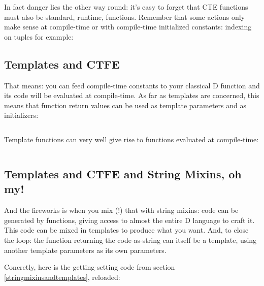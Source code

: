 In fact danger lies the other way round: it's easy to forget that CTE functions must also be standard, runtime, functions. Remember that some actions only make sense at compile-time or with compile-time initialized constants: indexing on tuples for example:

\subsection{}



\subsection{Templates and CTFE} \label{templatesandctfe}

That means: you can feed compile-time constants to your classical D function and its code will be evaluated at compile-time. As far as templates are concerned, this means that function return values can be used as template parameters and as  initializers:

\begin{verbatim}

\end{verbatim}

Template functions can very well give rise to functions evaluated at compile-time:

\begin{verbatim}
\end{verbatim}

\subsection{Templates and CTFE and String Mixins, oh my!}
\label{templatesandctfeandstringmixins}

And the fireworks is when you mix (!) that with string mixins: code can be generated by functions, giving access to almost the entire D language to craft it. This code can be mixed in templates to produce what you want. And, to close the loop: the function returning the code-as-string can itself be a template, using another template parameters as its own parameters.

Concretly, here is the getting-setting code from section \ref{stringmixinsandtemplates}, reloaded:

